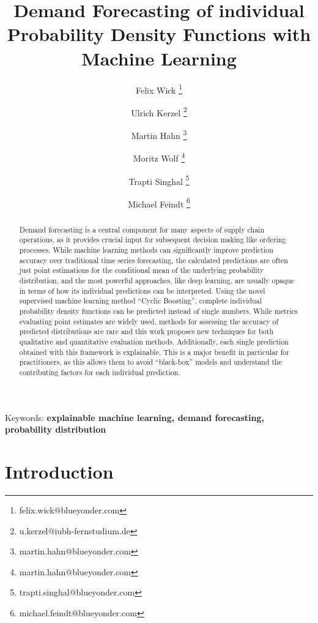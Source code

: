 \documentclass[BCOR=1mm, DIV=calc,10pt,
twoside=true,
twocolumn,
headings=normal]{scrartcl}
\begin{document}
\title{Demand Forecasting of individual Probability Density Functions with Machine Learning}

\author[1]{Felix Wick \thanks{felix.wick@blueyonder.com}}
\author[3]{Ulrich Kerzel \thanks{u.kerzel@iubh-fernstudium.de}}
\author[1]{Martin Hahn \thanks{martin.hahn@blueyonder.com}}
\author[1]{Moritz Wolf \thanks{martin.hahn@blueyonder.com}}
\author[2]{Trapti Singhal \thanks{trapti.singhal@blueyonder.com}}
\author[1]{Michael Feindt \thanks{michael.feindt@blueyonder.com}}


\date{}

\maketitle

\begin{abstract}
Demand forecasting is a central component for many aspects of supply chain operations, as it provides crucial input for subsequent decision making like ordering processes. While machine learning methods can significantly improve prediction accuracy over traditional time series forecasting, the calculated predictions are often just point estimations for the conditional mean of the underlying probability distribution, and the most powerful approaches, like deep learning, are usually opaque in terms of how its individual predictions can be interpreted. Using the novel supervised machine learning method ``Cyclic Boosting'', complete individual probability density functions can be predicted instead of single numbers. While metrics evaluating point estimates are widely used, methods for assessing the accuracy of predicted distributions are rare and this work proposes new techniques for both qualitative and quantitative evaluation methods. Additionally, each single prediction obtained with this framework is explainable. This is a major benefit in particular for practitioners, as this allows them to avoid ``black-box'' models and understand the contributing factors for each individual prediction. 
\end{abstract}

{Keywords: \textbf{explainable machine learning, demand forecasting, probability distribution}}


\section{Introduction}
\label{sec:intro}
\end{document}
